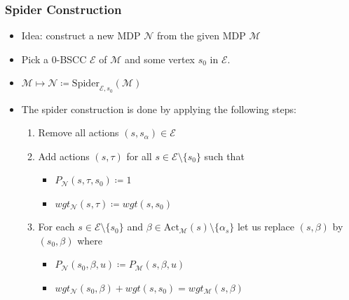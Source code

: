 \documentclass[onlymath]{beamer}
\begin{document}
\begin{frame}
	\frametitle{Spider Construction}
	\begin{itemize}
		\item Idea: construct a new MDP $\mathcal{N}$ from the given MDP $\mathcal{M}$
		\item Pick a 0-BSCC $\mathcal{E}$ of $\mathcal{M}$ and some vertex $s_0$ in $\mathcal{E}$.
		\item $\mathcal{M} \mapsto \mathcal{N} \coloneqq \mathrm{Spider}_{\mathcal{E}, s_0}(\mathcal{M})$
		\item The spider construction is done by applying the following steps:
		\begin{enumerate}
			\item Remove all actions $(s, s_\alpha) \in \mathcal{E}$
			\item Add actions $(s, \tau)$ for all $s\in \mathcal{E} \setminus \{s_0\}$ such that
			\begin{itemize}
				\item $P_{\mathcal{N}}(s,\tau,s_0) \coloneqq 1$
				\item $wgt_{\mathcal{N}}(s,\tau) \coloneqq wgt (s, s_0)$
			\end{itemize}
			\item For each $s\in \mathcal{E}\setminus\{s_0\}$ and $\beta \in \mathrm{Act}_{\mathcal{M}}(s)\setminus\{\alpha_s\}$ let us replace $(s,\beta)$ by $(s_0,\beta)$ where
			\begin{itemize}
				\item $P_{\mathcal{N}}(s_0,\beta,u) \coloneqq P_{\mathcal{M}}(s,\beta,u)$
				\item $wgt_{\mathcal{N}}(s_0,\beta) + wgt (s, s_0) = wgt_{\mathcal{M}}(s,\beta)$
			\end{itemize}
		\end{enumerate}
	\end{itemize}

\end{frame}
\end{document}
